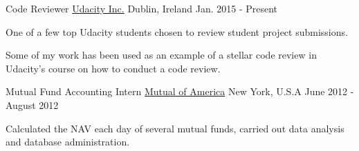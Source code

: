 \begin{cventries}
  \cventry
    {Code Reviewer}
    {\href{https://www.udacity.com/}{Udacity Inc.}}
    {Dublin, Ireland}
    {Jan. 2015 - Present}
    {
      \begin{cvitems}
        \item {One of a few top Udacity students chosen to review student project submissions.}
        \item {Some of my work has been used as an example of a stellar code review in Udacity's course on how to conduct a code review.}
      \end{cvitems}
    }
  \cventry
    {Mutual Fund Accounting Intern}
    {\href{https://www.mutualofamerica.com/}{Mutual of America}}
    {New York, U.S.A}
    {June 2012 - August 2012}
    {
      \begin{cvitems}
        \item {Calculated the NAV each day of several mutual funds, carried out data analysis and database administration.}
      \end{cvitems}
    }
    
  
 
\end{cventries}


